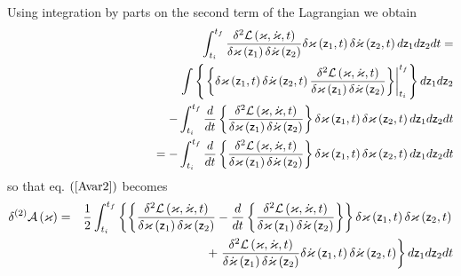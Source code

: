 Using integration by parts on the second term of the Lagrangian we obtain 
\begin{eqnarray}
&&\int_{t_{i}}^{t_{f}}\frac{\delta ^{2}{\cal L}\left( {\cal \varkappa },%
{\cal \dot{\varkappa}},t\right) }{\delta \varkappa \left( {\sf z}_{1}\right)
\delta \dot{\varkappa}\left( {\sf z}_{2}\right) }\delta \varkappa \left( 
{\sf z}_{1},t\right) \delta \dot{\varkappa}\left( {\sf z}_{2},t\right) d{\sf %
z}_{1}d{\sf z}_{2}dt=  \nonumber \\
&&\int \left\{ \left. \left\{ \delta \varkappa \left( {\sf z}_{1},t\right)
\delta \dot{\varkappa}\left( {\sf z}_{2},t\right) \frac{\delta ^{2}{\cal L}%
\left( \varkappa ,\dot{\varkappa},t\right) }{\delta \varkappa \left( {\sf z}%
_{1}\right) \delta \dot{\varkappa}\left( {\sf z}_{2}\right) }\right\}
\right| _{t_{i}}^{t_{f}}\right\} d{\sf z}_{1}d{\sf z}_{2}  \nonumber \\
&&\qquad \qquad \qquad \qquad \qquad -\int_{t_{i}}^{t_{f}}\frac{d}{dt}%
\left\{ \frac{\delta ^{2}{\cal L}\left( \varkappa ,\dot{\varkappa},t\right) 
}{\delta \varkappa \left( {\sf z}_{1}\right) \delta \dot{\varkappa}\left( 
{\sf z}_{2}\right) }\right\} \delta \varkappa \left( {\sf z}_{1},t\right)
\delta \varkappa \left( {\sf z}_{2},t\right) d{\sf z}_{1}d{\sf z}_{2}dt 
\nonumber \\
&&\left. {}\right. \qquad \qquad \qquad \qquad \qquad \quad
=-\int_{t_{i}}^{t_{f}}\frac{d}{dt}\left\{ \frac{\delta ^{2}{\cal L}\left(
\varkappa ,\dot{\varkappa},t\right) }{\delta \varkappa \left( {\sf z}%
_{1}\right) \delta \dot{\varkappa}\left( {\sf z}_{2}\right) }\right\} \delta
\varkappa \left( {\sf z}_{1},t\right) \delta \varkappa \left( {\sf z}%
_{2},t\right) d{\sf z}_{1}d{\sf z}_{2}dt
\end{eqnarray}%
so that eq. $\left( \ref{Avar2}\right) $ becomes 
\begin{eqnarray}
\delta ^{\left( 2\right) }{\cal A}\left( \varkappa \right) &=&\frac{1}{2}%
\int_{t_{i}}^{t_{f}}\left\{ \left\{ \frac{\delta ^{2}{\cal L}\left( {\cal %
\varkappa },{\cal \dot{\varkappa}},t\right) }{\delta \varkappa \left( {\sf z}%
_{1}\right) \delta \varkappa \left( {\sf z}_{2}\right) }-\frac{d}{dt}\left\{ 
\frac{\delta ^{2}{\cal L}\left( \varkappa ,\dot{\varkappa},t\right) }{\delta
\varkappa \left( {\sf z}_{1}\right) \delta \dot{\varkappa}\left( {\sf z}%
_{2}\right) }\right\} \right\} \delta \varkappa \left( {\sf z}_{1},t\right)
\delta \varkappa \left( {\sf z}_{2},t\right) \right.  \nonumber \\
&&\qquad \qquad \qquad \qquad \qquad +\left. \frac{\delta ^{2}{\cal L}\left( 
{\cal \varkappa },{\cal \dot{\varkappa}},t\right) }{\delta \dot{\varkappa}%
\left( {\sf z}_{1}\right) \delta \dot{\varkappa}\left( {\sf z}_{2}\right) }%
\delta \dot{\varkappa}\left( {\sf z}_{1},t\right) \delta \dot{\varkappa}%
\left( {\sf z}_{2},t\right) \right\} d{\sf z}_{1}d{\sf z}_{2}dt
\label{Avar2a}
\end{eqnarray}%
